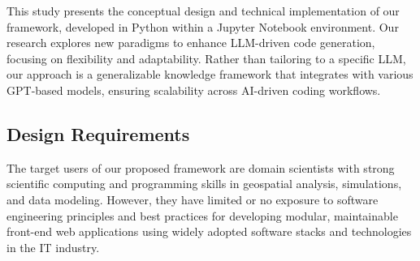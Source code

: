 This study presents the conceptual design and technical implementation of our framework, developed in Python within a Jupyter Notebook environment. Our research explores new paradigms to enhance LLM-driven code generation, focusing on flexibility and adaptability. Rather than tailoring to a specific LLM, our approach is a generalizable knowledge framework that integrates with various GPT-based models, ensuring scalability across AI-driven coding workflows.

\subsection{Design Requirements}
\label{subsec:DesignRequire}
The target users of our proposed framework are domain scientists with strong scientific computing and programming skills in geospatial analysis, simulations, and data modeling. However, they have limited or no exposure to software engineering principles and best practices for developing modular, maintainable front-end web applications using widely adopted software stacks and technologies in the IT industry.

